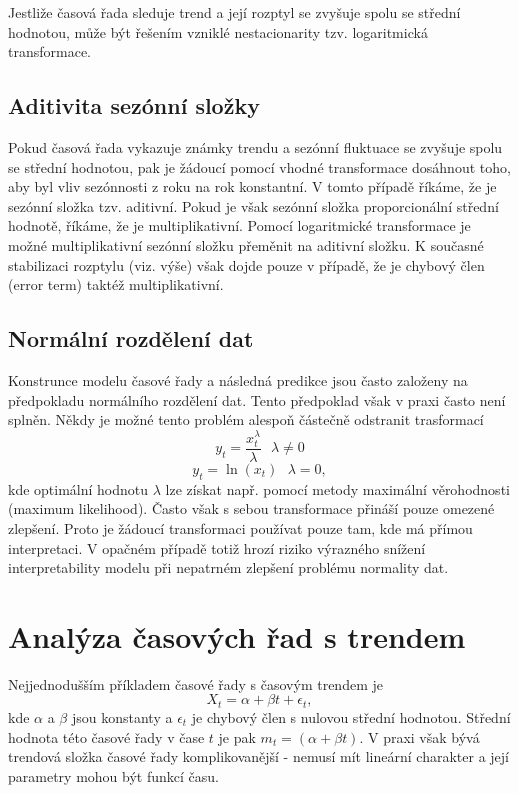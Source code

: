 Jestliže časová řada sleduje trend a její rozptyl se zvyšuje spolu se střední hodnotou, může být řešením vzniklé nestacionarity tzv. logaritmická transformace.

\subsection{Aditivita sezónní složky}

Pokud časová řada vykazuje známky trendu a sezónní fluktuace se zvyšuje spolu se střední hodnotou, pak je žádoucí pomocí vhodné transformace dosáhnout toho, aby byl vliv sezónnosti z roku na rok konstantní. V tomto případě říkáme, že je sezónní složka tzv. aditivní. Pokud je však sezónní složka proporcionální střední hodnotě, říkáme, že je multiplikativní. Pomocí logaritmické transformace je možné multiplikativní sezónní složku přeměnit na aditivní složku. K současné stabilizaci rozptylu (viz. výše) však dojde pouze v případě, že je chybový člen (error term) taktéž multiplikativní.

\subsection{Normální rozdělení dat}

Konstrunce modelu časové řady a následná predikce jsou často založeny na předpokladu normálního rozdělení dat. Tento předpoklad však v praxi často není splněn. Někdy je možné tento problém alespoň částečně odstranit trasformací
\begin{equation}
y_t = \frac{x_t^{\lambda}}{\lambda} ~~~ \lambda \ne 0
\end{equation}
\begin{equation}
y_t = \ln(x_t) ~~~ \lambda = 0,
\end{equation}
kde optimální hodnotu $\lambda$ lze získat např. pomocí metody maximální věrohodnosti (maximum likelihood). Často však s sebou transformace přináší pouze omezené zlepšení. Proto je žádoucí transformaci používat pouze tam, kde má přímou interpretaci. V opačném případě totiž hrozí riziko výrazného snížení interpretability modelu při nepatrném zlepšení problému normality dat.

\section{Analýza časových řad s trendem}

Nejjednodušším příkladem časové řady s časovým trendem je
\begin{equation}
X_t = \alpha + \beta t + \epsilon_t,
\end{equation}
kde $\alpha$ a $\beta$ jsou konstanty a $\epsilon_t$ je chybový člen s nulovou střední hodnotou. Střední hodnota této časové řady v čase $t$ je pak $m_t = (\alpha + \beta t)$. V praxi však bývá trendová složka časové řady komplikovanější - nemusí mít lineární charakter a její parametry mohou být funkcí času.

